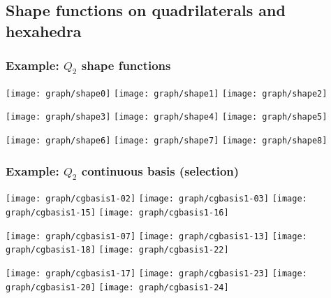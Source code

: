 \documentclass[american,ignorenonframetext,notheorems,aspectratio=1610]{beamer}
\begin{document}
\frame {}
\frame {}
\frame {
  }
\frame {}
\frame {}

\subsection{Shape functions on quadrilaterals and hexahedra}
\frame{\subtoc}

\frame {}
\frame {}

\begin{frame}
  \frametitle{Example: $Q_2$ shape functions}
  \begin{center}
    \texttt{[image: graph/shape0]}
    \texttt{[image: graph/shape1]}
    \texttt{[image: graph/shape2]}

    \texttt{[image: graph/shape3]}
    \texttt{[image: graph/shape4]}
    \texttt{[image: graph/shape5]}

    \texttt{[image: graph/shape6]}
    \texttt{[image: graph/shape7]}
    \texttt{[image: graph/shape8]}
  \end{center}
\end{frame}

\frame {}

\begin{frame}
  \frametitle{Example: $Q_2$ continuous basis (selection)}
  \begin{center}
    \texttt{[image: graph/cgbasis1-02]}
    \texttt{[image: graph/cgbasis1-03]}
    \texttt{[image: graph/cgbasis1-15]}
    \texttt{[image: graph/cgbasis1-16]}

    \texttt{[image: graph/cgbasis1-07]}
    \texttt{[image: graph/cgbasis1-13]}
    \texttt{[image: graph/cgbasis1-18]}
    \texttt{[image: graph/cgbasis1-22]}

    \texttt{[image: graph/cgbasis1-17]}
    \texttt{[image: graph/cgbasis1-23]}
    \texttt{[image: graph/cgbasis1-20]}
    \texttt{[image: graph/cgbasis1-24]}
  \end{center}
\end{frame}
\end{document}
